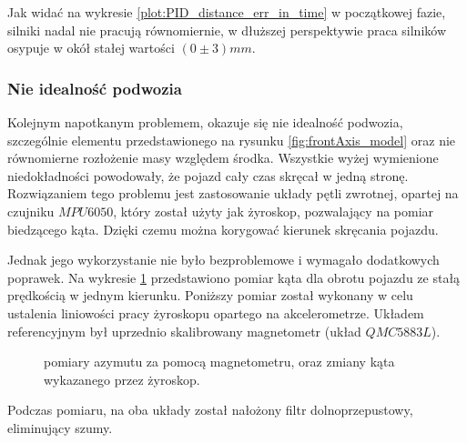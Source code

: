             Jak widać na wykresie \ref{plot:PID_distance_err_in_time} w początkowej fazie, silniki nadal nie pracują równomiernie, w dłuższej perspektywie praca silników osypuje w okół stałej wartości $(0 \pm 3)mm$.

    \subsubsection{Nie idealność podwozia}
        Kolejnym napotkanym problemem, okazuje się nie idealność podwozia, szczególnie elementu przedstawionego na rysunku \ref{fig:frontAxis_model} oraz nie równomierne rozłożenie masy względem środka.
        Wszystkie wyżej wymienione niedokładności powodowały, że pojazd cały czas skręcał w jedną stronę.
        Rozwiązaniem tego problemu jest zastosowanie układy pętli zwrotnej, opartej na czujniku $MPU6050$, który został użyty jak żyroskop, pozwalający na pomiar biedzącego kąta.
        Dzięki czemu można korygować kierunek skręcania pojazdu.
        
        Jednak jego wykorzystanie nie było bezproblemowe i wymagało dodatkowych poprawek.
        Na wykresie \ref{plot:gyro_magneto_measure} przedstawiono pomiar kąta dla obrotu pojazdu ze stałą prędkością w jednym kierunku.
        Poniższy pomiar został wykonany w celu ustalenia liniowości pracy żyroskopu opartego na akcelerometrze. 
        Układem referencyjnym był uprzednio skalibrowany magnetometr (układ $QMC5883L$).
% 
        \begin{figure}[!ht]
            \centering
                \renewcommand{\figurename}{Wykres}
                \caption{pomiary azymutu za pomocą magnetometru, oraz zmiany kąta wykazanego przez żyroskop.}
                \label{plot:gyro_magneto_measure}
        \end{figure}
        Podczas pomiaru, na oba układy został nałożony filtr dolnoprzepustowy, eliminujący szumy.

